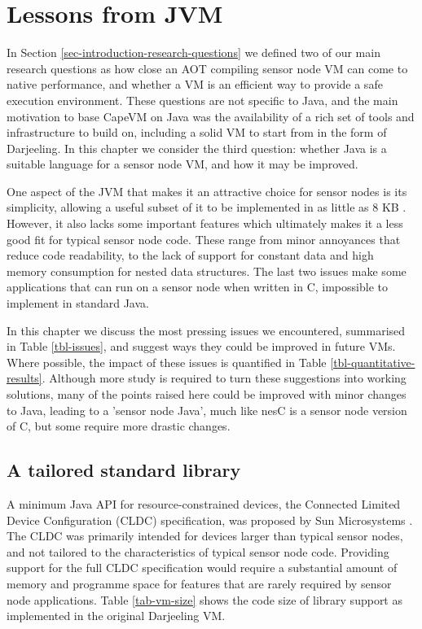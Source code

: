 \chapter{Lessons from JVM}



\label{sec-lessons-from-jvm}

In Section \ref{sec-introduction-research-questions} we defined two of our main research questions as how close an AOT compiling sensor node VM can come to native performance, and whether a VM is an efficient way to provide a safe execution environment. These questions are not specific to Java, and the main motivation to base CapeVM on Java was the availability of a rich set of tools and infrastructure to build on, including a solid VM to start from in the form of Darjeeling. In this chapter we consider the third question: whether Java is a suitable language for a sensor node VM, and how it may be improved.

One aspect of the JVM that makes it an attractive choice for sensor nodes is its simplicity, allowing a useful subset of it to be implemented in as little as 8 KB \cite{Harbaum}. However, it also lacks some important features which ultimately makes it a less good fit for typical sensor node code. These range from minor annoyances that reduce code readability, to the lack of support for constant data and high memory consumption for nested data structures. The last two issues make some applications that can run on a sensor node when written in C, impossible to implement in standard Java.

In this chapter we discuss the most pressing issues we encountered, summarised in Table \ref{tbl-issues}, and suggest ways they could be improved in future VMs. Where possible, the impact of these issues is quantified in Table \ref{tbl-quantitative-results}. Although more study is required to turn these suggestions into working solutions, many of the points raised here could be improved with minor changes to Java, leading to a 'sensor node Java', much like nesC \cite{Gay:2003up} is a sensor node version of C, but some require more drastic changes.




\section{A tailored standard library}
\label{sec-std-lib}

A minimum Java API for resource-constrained devices, the Connected Limited Device Configuration (CLDC) specification, was proposed by Sun Microsystems \cite{CLDC}. The CLDC was primarily intended for devices larger than typical sensor nodes, and not tailored to the characteristics of typical sensor node code. Providing support for the full CLDC specification would require a substantial amount of memory and programme space for features that are rarely required by sensor node applications. Table \ref{tab-vm-size} shows the code size of library support as implemented in the original Darjeeling VM.

